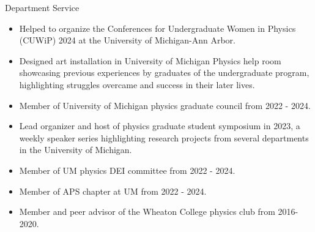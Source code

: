 \documentclass{resume} %
\begin{document}
\begin{rSection}{Department Service}
    \begin{itemize}
        \item Helped to organize the Conferences for Undergraduate Women in Physics (CUWiP) 2024 at the University of Michigan-Ann Arbor.
        \item Designed art installation in University of Michigan Physics help room showcasing previous experiences by graduates of the undergraduate program, highlighting struggles overcame and success in their later lives.
        \item Member of University of Michigan physics graduate council from 2022 - 2024. 
        \item Lead organizer and host of physics graduate student symposium in 2023, a weekly speaker series highlighting research projects from several departments in the University of Michigan.
    	\item Member of UM physics DEI committee from 2022 - 2024.
	\item Member of APS chapter at UM from 2022 - 2024.
        \item Member and peer advisor of the Wheaton College physics club from 2016-2020.
    \end{itemize}
\end{rSection}
\newpage
\end{document}

